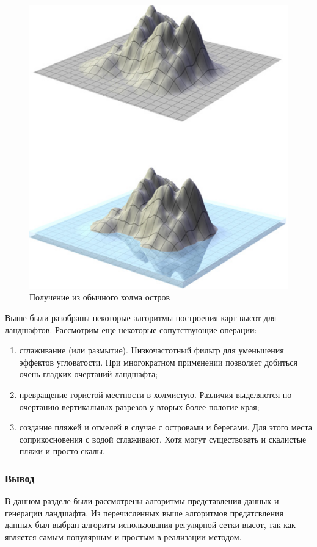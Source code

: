 \documentclass[a4paper, 10pt]{article}
\begin{document}
	\begin{figure}[h!]
		\centering
		\includegraphics[scale=0.9]{two}
		\centering\caption{Получение из обычного холма остров}
	\end{figure}
	 Выше были разобраны некоторые алгоритмы построения карт высот для ландшафтов. Рассмотрим еще некоторые сопутствующие операции:
	\begin{enumerate}
		\item сглаживание (или размытие). Низкочастотный фильтр для уменьшения эффектов угловатости. При многократном применении позволяет добиться очень гладких очертаний ландшафта;
		\item превращение гористой местности в холмистую. Различия выделяются по очертанию вертикальных разрезов у вторых более пологие края;
		\item создание пляжей и отмелей в случае с островами и берегами. Для этого места соприкосновения с водой сглаживают. Хотя могут существовать и скалистые пляжи и просто скалы.
	\end{enumerate}
	\subsubsection{Вывод}
	\hspace*{5mm} В данном разделе были рассмотрены алгоритмы представления данных и генерации ландшафта. Из перечисленных выше алгоритмов предатсвления данных был выбран алгоритм использования регулярной сетки высот, так как является самым популярным и простым в реализации методом.
\end{document}

